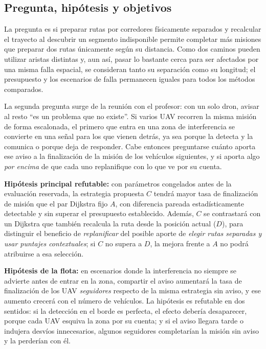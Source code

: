 \documentclass[journal,10pt]{IEEEtran}
\begin{document}
\subsection{Pregunta, hipótesis y objetivos}

La pregunta es si preparar rutas por corredores físicamente separados y
recalcular el trayecto al descubrir un segmento indisponible permite
completar más misiones que preparar dos rutas únicamente según su
distancia. Como dos caminos pueden utilizar aristas distintas y, aun así,
pasar lo bastante cerca para ser afectados por una misma falla espacial,
se consideran tanto su separación como su longitud; el presupuesto y los
escenarios de falla permanecen iguales para todos los métodos comparados.

La segunda pregunta surge de la reunión con el profesor: con un solo dron,
avisar al resto ``es un problema que no existe''. Si varios UAV recorren la
misma misión de forma escalonada, el primero que entra en una zona de
interferencia se convierte en una señal para los que vienen detrás, ya sea
porque la detecta y la comunica o porque deja de responder. Cabe entonces
preguntarse cuánto aporta ese aviso a la finalización de la misión de los
vehículos siguientes, y si aporta algo \emph{por encima} de que cada uno
replanifique con lo que ve por su cuenta.

\textbf{Hipótesis principal refutable:} con parámetros congelados antes de la
evaluación reservada, la estrategia propuesta $C$ tendrá mayor tasa de
finalización de misión que el par Dijkstra fijo $A$, con diferencia pareada
estadísticamente detectable y sin superar el presupuesto establecido.
Además, $C$ se contrastará con un Dijkstra que también recalcula la ruta
desde la posición actual ($D$), para distinguir el beneficio de
\emph{replanificar} del posible aporte de \emph{elegir rutas separadas y
usar puntajes contextuales}; si $C$ no supera a $D$, la mejora frente a
$A$ no podrá atribuirse a esa selección.

\textbf{Hipótesis de la flota:} en escenarios donde la interferencia no
siempre se advierte antes de entrar en la zona, compartir el aviso aumentará
la tasa de finalización de los UAV \emph{seguidores} respecto de la misma
estrategia sin aviso, y ese aumento crecerá con el número de vehículos. La
hipótesis es refutable en dos sentidos: si la detección en el borde es
perfecta, el efecto debería desaparecer, porque cada UAV esquiva la zona por
su cuenta; y si el aviso llegara tarde o indujera desvíos innecesarios,
algunos seguidores completarían la misión sin aviso y la perderían con él.
\end{document}
